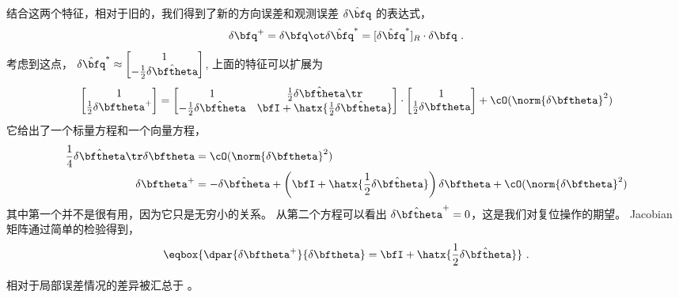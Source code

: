 结合这两个特征，相对于旧的，我们得到了新的方向误差和观测误差 $\hat{\delta\bfq}$ 的表达式，
%
\begin{equation}
\delta\bfq^+ = \delta\bfq \ot \hat{\delta\bfq}^*  = [\hat{\delta\bfq}^*]_R\cdot\delta\bfq~.
\end{equation}
%
考虑到这点，
%
$\hat{\delta\bfq}^* \approx \begin{bmatrix}
1 \\ -\frac12\hat{\delta\bftheta}
\end{bmatrix}$,
%
上面的特征可以扩展为
%
\begin{equation}
\begin{bmatrix}
1 \\ \frac12\delta\bftheta^+
\end{bmatrix}
=
\begin{bmatrix}
1                  & \frac12\hat{\delta\bftheta}\tr \\
-\frac12\hat{\delta\bftheta} & \bfI + \hatx{\frac12\hat{\delta\bftheta}}
\end{bmatrix}
\cdot
\begin{bmatrix}
1 \\ \frac12\delta\bftheta
\end{bmatrix} + \cO(\norm{\delta\bftheta}^2)
\end{equation}
%
它给出了一个标量方程和一个向量方程，
%
\begin{subequations}
%
\begin{align}
\frac14\hat{\delta\bftheta}\tr\delta\bftheta &= \cO(\norm{\delta\bftheta}^2)\\
\delta\bftheta^+ &= -\hat{\delta\bftheta} + \left(\bfI + \hatx{\frac12\hat{\delta\bftheta}}\right)\delta\bftheta + \cO(\norm{\delta\bftheta}^2)
\end{align}%
\end{subequations}
%
其中第一个并不是很有用，因为它只是无穷小的关系。 
从第二个方程可以看出 $\hat{\delta\bftheta}^+ = 0$，这是我们对复位操作的期望。 
Jacobian 矩阵通过简单的检验得到，
%
\begin{equation}
\eqbox{\dpar{\delta\bftheta^+}{\delta\bftheta} = \bfI + \hatx{\frac12\hat{\delta\bftheta}}}~.
\end{equation}

相对于局部误差情况的差异被汇总于 。


